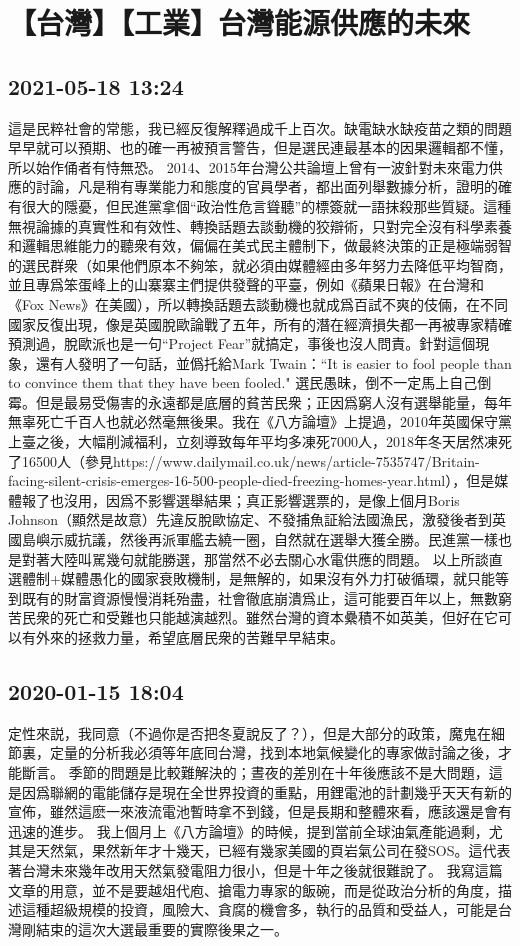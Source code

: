 \documentclass[twocolumn]{ctexart}
\begin{document}
\section*{【台灣】【工業】台灣能源供應的未來}
\subsection*{2021-05-18 13:24}

這是民粹社會的常態，我已經反復解釋過成千上百次。缺電缺水缺疫苗之類的問題早早就可以預期、也的確一再被預言警告，但是選民連最基本的因果邏輯都不懂，所以始作俑者有恃無恐。
2014、2015年台灣公共論壇上曾有一波針對未來電力供應的討論，凡是稍有專業能力和態度的官員學者，都出面列舉數據分析，證明的確有很大的隱憂，但民進黨拿個“政治性危言聳聽”的標簽就一語抹殺那些質疑。這種無視論據的真實性和有效性、轉換話題去談動機的狡辯術，只對完全沒有科學素養和邏輯思維能力的聽衆有效，偏偏在美式民主體制下，做最終決策的正是極端弱智的選民群衆（如果他們原本不夠笨，就必須由媒體經由多年努力去降低平均智商，並且專爲笨蛋峰上的山寨寨主們提供發聲的平臺，例如《蘋果日報》在台灣和《Fox News》在美國），所以轉換話題去談動機也就成爲百試不爽的伎倆，在不同國家反復出現，像是英國脫歐論戰了五年，所有的潛在經濟損失都一再被專家精確預測過，脫歐派也是一句“Project Fear”就搞定，事後也沒人問責。針對這個現象，還有人發明了一句話，並僞托給Mark Twain：“It is easier to fool people than to convince them that they have been fooled."
選民愚昧，倒不一定馬上自己倒霉。但是最易受傷害的永遠都是底層的貧苦民衆；正因爲窮人沒有選舉能量，每年無辜死亡千百人也就必然毫無後果。我在《八方論壇》上提過，2010年英國保守黨上臺之後，大幅削減福利，立刻導致每年平均多凍死7000人，2018年冬天居然凍死了16500人（參見https://www.dailymail.co.uk/news/article-7535747/Britain-facing-silent-crisis-emerges-16-500-people-died-freezing-homes-year.html），但是媒體報了也沒用，因爲不影響選舉結果；真正影響選票的，是像上個月Boris Johnson（顯然是故意）先違反脫歐協定、不發捕魚証給法國漁民，激發後者到英國島嶼示威抗議，然後再派軍艦去繞一圈，自然就在選舉大獲全勝。民進黨一樣也是對著大陸叫駡幾句就能勝選，那當然不必去關心水電供應的問題。
以上所談直選體制+媒體愚化的國家衰敗機制，是無解的，如果沒有外力打破循環，就只能等到既有的財富資源慢慢消耗殆盡，社會徹底崩潰爲止，這可能要百年以上，無數窮苦民衆的死亡和受難也只能越演越烈。雖然台灣的資本纍積不如英美，但好在它可以有外來的拯救力量，希望底層民衆的苦難早早結束。
\subsection*{2020-01-15 18:04}

定性來説，我同意（不過你是否把冬夏說反了？），但是大部分的政策，魔鬼在細節裏，定量的分析我必須等年底囘台灣，找到本地氣候變化的專家做討論之後，才能斷言。 
季節的問題是比較難解決的；晝夜的差別在十年後應該不是大問題，這是因爲聯網的電能儲存是現在全世界投資的重點，用鋰電池的計劃幾乎天天有新的宣佈，雖然這麽一來液流電池暫時拿不到錢，但是長期和整體來看，應該還是會有迅速的進步。 
我上個月上《八方論壇》的時候，提到當前全球油氣產能過剩，尤其是天然氣，果然新年才十幾天，已經有幾家美國的頁岩氣公司在發SOS。這代表著台灣未來幾年改用天然氣發電阻力很小，但是十年之後就很難說了。 
我寫這篇文章的用意，並不是要越俎代庖、搶電力專家的飯碗，而是從政治分析的角度，描述這種超級規模的投資，風險大、貪腐的機會多，執行的品質和受益人，可能是台灣剛結束的這次大選最重要的實際後果之一。
\end{document}
